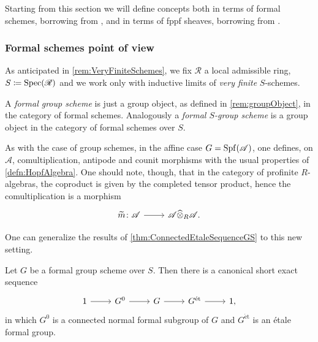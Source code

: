 Starting from this section we will define
concepts both in terms of formal schemes, borrowing from \cite{Shatz},
and in terms of fppf sheaves, borrowing from \cite{Messing}.



\subsubsection{Formal schemes point of view}
As anticipated in \cref{rem:VeryFiniteSchemes},
we fix $\mathscr{R}$ a local admissible ring, $S \coloneqq \operatorname{Spec}(\mathscr{R})$
and we work only with inductive limits of \emph{very finite} $S$-schemes.


\begin{defn}
	A \emph{formal group scheme}
	is just a group object,
	as defined in \cref{rem:groupObject},
	in the category of formal schemes.
	Analogously a \emph{formal $S$-group scheme}
	is a group object in the category of formal schemes over $S$.
\end{defn}


\begin{rem}[]\label{FormalHopf}
	As with the case of group schemes, in the affine case
	$G = \operatorname{Spf}(\mathscr{A})$,
	one defines, on $\mathscr{A}$, comultiplication, antipode and counit morphisms
	with the usual properties of \cref{defn:HopfAlgebra}.
	One should note, though, that in the category of 
	profinite $R$-algebras, the coproduct is given by
	the completed tensor product, hence the comultiplication
	is a morphism
	\begin{equation*}
	\begin{tikzcd}[row sep = 0ex
		,/tikz/column 1/.append style={anchor=base east}
		,/tikz/column 2/.append style={anchor=base west}]
		\widetilde{m}\colon \mathscr{A} \arrow[r, "", rightarrow] &
		\mathscr{A} \widehat{\otimes}_R \mathscr{A}
	.\end{tikzcd}
	\end{equation*} 
\end{rem}


\noindent
One can generalize the results of \cref{thm:ConnectedEtaleSequenceGS} to this new setting.
\begin{thm}\label{thm:ConnectedEtaleSeqFormalGr}
	Let $G$ be a formal group scheme over $S$.
	Then there is a canonical short exact sequence
	\begin{equation*}
	\begin{tikzcd}
		1 \arrow[r, "", rightarrow] &
		G^0 \arrow[r, "", rightarrow] &
		G \arrow[r, "", rightarrow] &
		G^{\mathrm{\acute et}} \arrow[r, "", rightarrow] &
		1
	,\end{tikzcd}
	\end{equation*}
	in which $G^0$ is a connected normal formal subgroup of $G$
	and $G^{\mathrm{\acute et}}$ is an étale formal group.
\end{thm}


